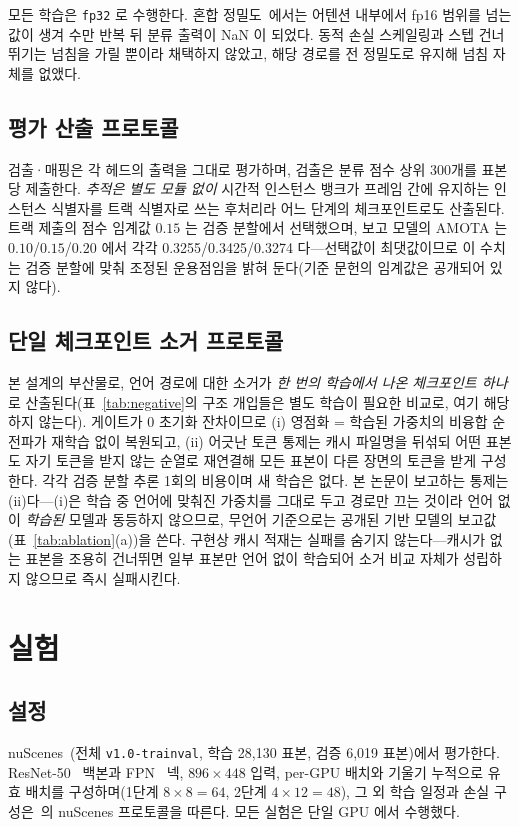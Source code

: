 \documentclass[conference]{IEEEtran}
\newcommand{\measured}[1]{#1}
\begin{document}
모든 학습은 \texttt{fp32} 로 수행한다. 혼합 정밀도~\cite{micikevicius2018mixed}에서는 어텐션
내부에서 fp16 범위를 넘는 값이 생겨 수만 반복 뒤 분류 출력이 NaN 이 되었다. 동적 손실
스케일링과 스텝 건너뛰기는 넘침을 가릴 뿐이라 채택하지 않았고,
해당 경로를 전 정밀도로 유지해 넘침 자체를 없앴다.

\subsection{평가 산출 프로토콜}
검출·매핑은 각 헤드의 출력을 그대로 평가하며, 검출은 분류 점수 상위 300개를 표본당
제출한다. \emph{추적은 별도 모듈 없이} 시간적 인스턴스 뱅크가 프레임 간에 유지하는
인스턴스 식별자를 트랙 식별자로 쓰는 후처리라 어느 단계의 체크포인트로도 산출된다. 트랙 제출의 점수 임계값 $0.15$ 는 검증 분할에서 선택했으며, 보고 모델의 AMOTA 는
$0.10$/$0.15$/$0.20$ 에서 각각 \measured{0.3255}/\measured{0.3425}/\measured{0.3274}
다---선택값이 최댓값이므로 이 수치는 검증 분할에 맞춰 조정된 운용점임을 밝혀 둔다(기준
문헌의 임계값은 공개되어 있지 않다).

\subsection{단일 체크포인트 소거 프로토콜}
\label{sec:onerun}
본 설계의 부산물로, 언어 경로에 대한 소거가 \emph{한 번의 학습에서 나온 체크포인트
하나}로 산출된다(표~\ref{tab:negative}의 구조 개입들은 별도 학습이 필요한 비교로, 여기
해당하지 않는다).
게이트가 0 초기화 잔차이므로 (i) 영점화 = 학습된 가중치의 비융합 순전파가 재학습 없이
복원되고, (ii) 어긋난 토큰 통제는 캐시 파일명을 뒤섞되 어떤 표본도 자기 토큰을 받지 않는
순열로 재연결해 모든 표본이 다른 장면의 토큰을 받게 구성한다. 각각 검증 분할 추론 1회의
비용이며 새 학습은 없다. 본 논문이 보고하는 통제는 (ii)다---(i)은 학습 중 언어에 맞춰진
가중치를 그대로 두고 경로만 끄는 것이라 언어 없이 \emph{학습된} 모델과 동등하지 않으므로,
무언어 기준으로는 공개된 기반 모델의 보고값(표~\ref{tab:ablation}(a))을 쓴다.
구현상 캐시 적재는 실패를 숨기지 않는다---캐시가 없는 표본을 조용히 건너뛰면 일부 표본만
언어 없이 학습되어 소거 비교 자체가 성립하지 않으므로 즉시 실패시킨다.

\section{실험}

\subsection{설정}
nuScenes~\cite{caesar2020nuscenes}(전체 \texttt{v1.0-trainval}, 학습 \measured{28{,}130}
표본, 검증 \measured{6{,}019} 표본)에서 평가한다. ResNet-50~\cite{he2016resnet} 백본과
FPN~\cite{lin2017fpn} 넥, $896\!\times\!448$ 입력, per-GPU 배치와 기울기 누적으로 유효 배치를
구성하며(1단계 $8\times8=64$, 2단계 $4\times12=48$), 그 외 학습 일정과 손실 구성은~\cite{hipad2025}의 nuScenes
프로토콜을 따른다. 모든 실험은 단일 GPU 에서 수행했다.
\end{document}
